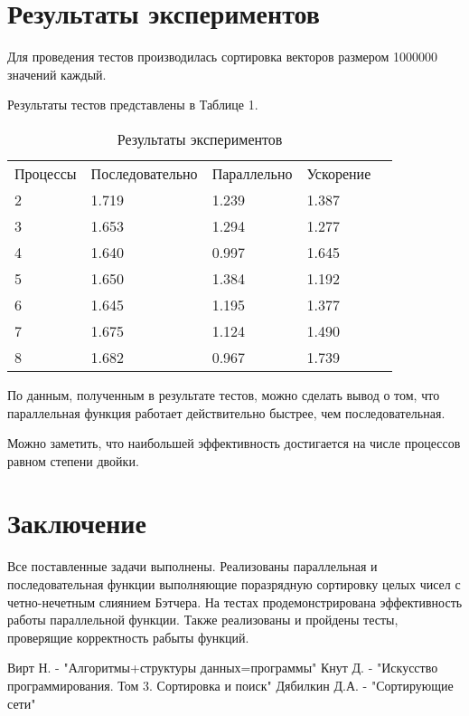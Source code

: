 \documentclass{report}
\begin{document}
	\section*{Результаты экспериментов}
	Для проведения тестов производилась сортировка векторов размером 1000000 значений каждый. 
	\par Результаты тестов представлены в Таблице 1.
	\begin{table}[!h]
		\caption{Результаты экспериментов}
		\centering
		\begin{tabular}{lllll}
			Процессы & Последовательно & Параллельно & Ускорение  \\
			2        & 1.719           & 1.239       & 1.387      \\
			3        & 1.653           & 1.294       & 1.277      \\
			4        & 1.640           & 0.997       & 1.645      \\
			5        & 1.650           & 1.384       & 1.192      \\
			6        & 1.645           & 1.195       & 1.377      \\
			7        & 1.675           & 1.124       & 1.490      \\
			8        & 1.682           & 0.967       & 1.739
		\end{tabular}
	\end{table}
	\par По данным, полученным в результате тестов, можно сделать вывод о том, что параллельная функция работает действительно быстрее, чем последовательная.
	\par Можно заметить, что наибольшей эффективность достигается на числе процессов равном степени двойки.
	\newpage
	
	\section*{Заключение}
	Все поставленные задачи выполнены. Реализованы параллельная и последовательная функции выполняющие поразрядную сортировку целых чисел с четно-нечетным слиянием Бэтчера. На тестах продемонстрирована эффективность работы параллельной функции. Также реализованы и пройдены тесты, проверящие корректность рабыты функций.
	\newpage
	
	\begin{thebibliography}{1}
		 Вирт Н. - "Алгоритмы+структуры данных=программы"
		 Кнут Д. - "Искусство программирования. Том 3. Сортировка и поиск"
		 Дябилкин Д.А. - "Сортирующие сети"
	\end{thebibliography}
	\newpage
	
\end{document}
